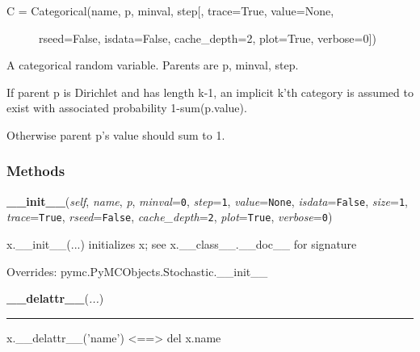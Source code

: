 \begin{description}
\item[{C = Categorical(name, p, minval, step{[}, trace=True, value=None,}] \leavevmode 
rseed=False, isdata=False, cache{\_}depth=2, plot=True, verbose=0{]})

\end{description}

A categorical random variable. Parents are p, minval, step.

If parent p is Dirichlet and has length k-1, an implicit k'th
category is assumed to exist with associated probability 1-sum(p.value).

Otherwise parent p's value should sum to 1.


  \subsubsection{Methods}

    \vspace{0.5ex}

    \begin{boxedminipage}{\textwidth}

    \raggedright \textbf{\_\_init\_\_}(\textit{self}, \textit{name}, \textit{p}, \textit{minval}=\texttt{0}, \textit{step}=\texttt{1}, \textit{value}=\texttt{None}, \textit{isdata}=\texttt{False}, \textit{size}=\texttt{1}, \textit{trace}=\texttt{True}, \textit{rseed}=\texttt{False}, \textit{cache\_depth}=\texttt{2}, \textit{plot}=\texttt{True}, \textit{verbose}=\texttt{0})

    x.\_\_init\_\_(...) initializes x; see x.\_\_class\_\_.\_\_doc\_\_ for 
    signature

    \vspace{1ex}

      Overrides: pymc.PyMCObjects.Stochastic.\_\_init\_\_

    \end{boxedminipage}

    \label{object:__delattr__}

    \vspace{0.5ex}

    \begin{boxedminipage}{\textwidth}

    \raggedright \textbf{\_\_delattr\_\_}(\textit{...})

    \vspace{-1.5ex}

    \rule{\textwidth}{0.5\fboxrule}
    x.\_\_delattr\_\_('name') {\textless}=={\textgreater} del x.name

    \vspace{1ex}

    \end{boxedminipage}


